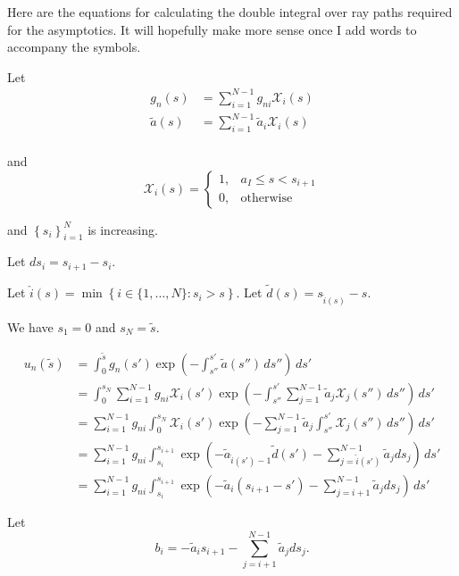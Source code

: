 Here are the equations for calculating the double integral over ray paths
required for the asymptotics. It will hopefully make more sense once I add words
to accompany the symbols.

Let
\begin{align}
  g_n(s) &= \sum_{i=1}^{N-1}g_{ni}\mathcal{X}_i(s) \\
  \tilde{a}(s) &= \sum_{i=1}^{N-1}\tilde{a}_{i}\mathcal{X}_i(s) \\
\end{align}

and
\begin{equation}
  \mathcal{X}_i(s) = \begin{cases}
    1, & a_I \leq s < s_{i+1} \\
    0, & \mbox{otherwise}
    \end{cases}
\end{equation}

and $\left\{s_i\right\}_{i=1}^N$ is increasing.

Let $ds_i = s_{i+1} - s_i$.

Let $\hat{i}(s) = \min\left\{ i \in \{1,\ldots,N\} : s_i>s \right\}$.
Let $\tilde{d}(s) = s_{\hat{i}(s)}-s$.

We have $s_1 = 0$ and $s_N = \tilde{s}$.


\begin{align}
  u_n(\tilde{s}) &= \int_0^{\tilde{s}}g_n(s')\exp\left( -\int_{s''}^{s'}\tilde{a}(s'')\,ds'' \right)\, ds' \\
  &= \int_0^{s_N} \sum_{i=1}^{N-1}g_{ni}\mathcal{X}_i(s') \exp\left( -\int_{s''}^{s'}\sum_{j=1}^{N-1}\tilde{a}_{j}\mathcal{X}_j(s'')\,ds'' \right)\, ds' \\
  &= \sum_{i=1}^{N-1}g_{ni}\int_0^{s_N} \mathcal{X}_i(s') \exp\left( -\sum_{j=1}^{N-1}\tilde{a}_{j}\int_{s''}^{s'}\mathcal{X}_j(s'')\,ds'' \right)\, ds' \\
  &= \sum_{i=1}^{N-1}g_{ni}\int_{s_i}^{s_{i+1}}  \exp\left(-\tilde{a}_{\hat{i}(s')-1}\tilde{d}(s') -\sum_{j=\hat{i}(s')}^{N-1}\tilde{a}_{j}ds_j\right)\, ds' \\
  &= \sum_{i=1}^{N-1}g_{ni}\int_{s_i}^{s_{i+1}}  \exp\left(-\tilde{a}_{i}(s_{i+1}-s') -\sum_{j=i+1}^{N-1}\tilde{a}_{j}ds_j\right)\, ds'
\end{align}

Let
\begin{equation}
  b_i = -\tilde{a}_{i}s_{i+1} - \sum_{j=i+1}^{N-1}\tilde{a}_{j}ds_j.
\end{equation}

